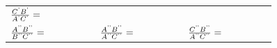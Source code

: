 {\begin{tabular}[t]{|l|l|l|}
                \begin{math}\frac{{C}^{\text{'}}{B}^{\text{'}}}{{A}^{\text{'}}{C}^{\text{'}}}=\phantom{\rule{42.67912pt}{0ex}}\end{math}
     \tabularnewline\cline{1-1}\cline{2-2}\cline{3-3}
                \begin{math}\frac{{A}^{\text{'}\text{'}}{B}^{\text{'}\text{'}}}{{B}^{\text{'}\text{'}}{C}^{\text{'}\text{'}}}=\phantom{\rule{42.67912pt}{0ex}}\end{math}
               &
                \begin{math}\frac{{A}^{\text{'}\text{'}}{B}^{\text{'}\text{'}}}{{A}^{\text{'}\text{'}}{C}^{\text{'}\text{'}}}=\phantom{\rule{42.67912pt}{0ex}}\end{math}
               &
                \begin{math}\frac{{C}^{\text{'}\text{'}}{B}^{\text{'}\text{'}}}{{A}^{\text{'}\text{'}}{C}^{\text{'}\text{'}}}=\phantom{\rule{42.67912pt}{0ex}}\end{math}
     \tabularnewline\cline{1-1}\cline{2-2}\cline{3-3}
    \end{tabular}} %
        \addtolength{\mytableboxheight}{\mytableboxdepth}
